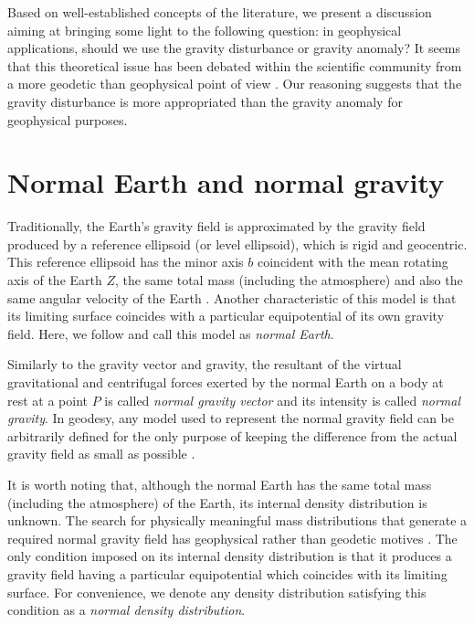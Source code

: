 \documentclass[extra]{gji}
\begin{document}
Based on well-established concepts of the literature,
we present a discussion aiming at bringing some
light to the following question: in geophysical applications,
should we use the gravity disturbance or gravity anomaly?
It seems that this theoretical issue has been 
debated within the scientific community from a 
more geodetic than geophysical point of view
\citep{lafehr1991,chapin1996,li2001,fairhead2003,
hackney-featherstone2003,hinze2005}.
Our reasoning suggests that the gravity 
disturbance is more appropriated than the gravity anomaly 
for geophysical purposes.


\section{Normal Earth and normal gravity}

Traditionally, the Earth's gravity field is approximated 
by the gravity field produced by a reference ellipsoid
(or level ellipsoid), which is rigid and geocentric.
This reference ellipsoid has the minor axis $b$ 
coincident with the mean rotating axis of the Earth $Z$, the 
same total mass (including the atmosphere) and also the
same angular velocity of the Earth \citep{heiskanen-moritz1967,
vanicek1987,hofmann-wellenhof-moritz2005,torge2012}.
Another characteristic of this model is that its
limiting surface coincides with a particular equipotential 
of its own gravity field.
Here, we follow \citep{torge2012} and call this model as
\textit{normal Earth}.

Similarly to the gravity vector and gravity, 
the resultant of the virtual 
gravitational and centrifugal forces exerted by the normal
Earth on a body at rest at a point $P$ is called 
\textit{normal gravity vector} and its intensity is called 
\textit{normal gravity}.
In geodesy, any model used to represent the normal gravity field
can be arbitrarily defined for the only purpose
of keeping the difference from the actual gravity field as small 
as possible \citep{vanicek1987}.

It is worth noting that, although the normal Earth has the
same total mass (including the atmosphere) of the Earth,
its internal density distribution is unknown.
The search for physically meaningful mass distributions 
that generate a required normal gravity field
has geophysical rather than geodetic motives \citep{marussi1974}.
The only condition imposed on its internal density
distribution is that it produces a gravity field
having a particular equipotential which coincides
with its limiting surface.
For convenience, we denote any density distribution 
satisfying this condition as a \textit{normal density distribution}.
\end{document}
